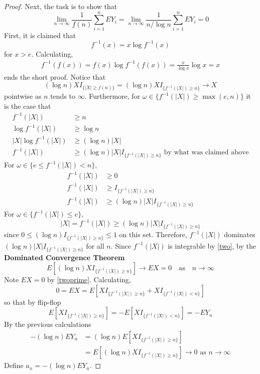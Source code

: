 \documentclass[letterpaper, 12pt]{article}
\begin{document}
\begin{proof}
Next, the task is to show that 
\begin{equation}
\lim_{n\to\infty}\frac{1}{f(n)}\sum_{i=1}^n EY_i 
= 
\lim_{n\to\infty}\frac{1}{n/\log n}\sum_{i=1}^n EY_i
=
0
\label{second}
\end{equation}
First, it is claimed that 
\[
f^{-1}(x) = x \log f^{-1}(x)
\]
for $x > e$.
Calculating,
\begin{align*}
f^{-1}(f(x)) = f(x) \log f^{-1}(f(x)) = \frac{x}{\log x} \log x = x
\end{align*}
ends the short proof.
Notice that
\[
(\log n) X I_{\{|X| \geq f(n)\}} = (\log n) X I_{\{f^{-1}(|X|) \geq n\}} \to X
\]
pointwise as $n$ tends to $\infty$. Furthermore, for $\omega \in {\{f^{-1}(|X|) \geq \max(e,n)\}}$ it is the case that
\begin{align*}
f^{-1}(|X|) 
&\geq 
n
\\
\log f^{-1}(|X|) 
&\geq
\log n
\\
|X| \log f^{-1}(|X|) 
&\geq 
(\log n) |X|
\\
f^{-1}(|X|) 
&\geq
(\log n )|X|I_{\{f^{-1}(|X|) \geq n\}}
\text{ by what was claimed above}
\end{align*}
For $\omega \in {\{e \leq f^{-1}(|X|) < n\}}$,
\begin{align*}
f^{-1}(|X|) 
&\geq 
0
\\
f^{-1}(|X|) 
&\geq 
I_{\{f^{-1}(|X|) \geq n\}}
\\
f^{-1}(|X|) 
&\geq
(\log n )|X|I_{\{f^{-1}(|X|) \geq n\}}
\end{align*}
For $\omega \in {\{f^{-1}(|X|) \leq e\}}$,
\[
|X| = f^{-1}(|X|) \geq (\log n) |X|I_{\{f^{-1}(|X|) \geq n\}}
\]
since $0 \leq (\log n) I_{\{f^{-1}(|X|) \geq n \}} \leq 1$ on this set. Therefore, $f^{-1}(|X|)$ dominates $(\log n )|X|I_{\{f^{-1}(|X|) \geq n\}}$ for all $n$. 
Since $f^{-1}(|X|)$ is integrable by \eqref{two},
by the \textbf{Dominated Convergence Theorem}
\[
E[ (\log n) X I_{\{f^{-1}(|X|) \geq n\}}] \to EX = 0
\quad \text{as}
\quad
n \to \infty
\]
Note $EX = 0$ by \eqref{twoprime}. 
Calculating, 
\[
0 = EX = E[X I_{\{f^{-1}(|X|) \geq n\}} + X I_{\{f^{-1}(|X|) < n\}}]
\]
so that by flip-flop
\[
E[X I_{\{f^{-1}(|X|) \geq n\}}] = - E[X I_{\{f^{-1}(|X|) < n\}}] = -EY_n
\]
By the previous calculations
\begin{align*}
-(\log n)EY_n
&=
(\log n) E[X I_{\{f^{-1}(|X|) \geq n\}}]
\\
&=
E[(\log n)X I_{\{f^{-1}(|X|) \geq n\}}]
\to 
0
\text{ as }n \to \infty
\end{align*}
Define $a_n = -(\log n)EY_n$. 

\end{proof}
\end{document}
